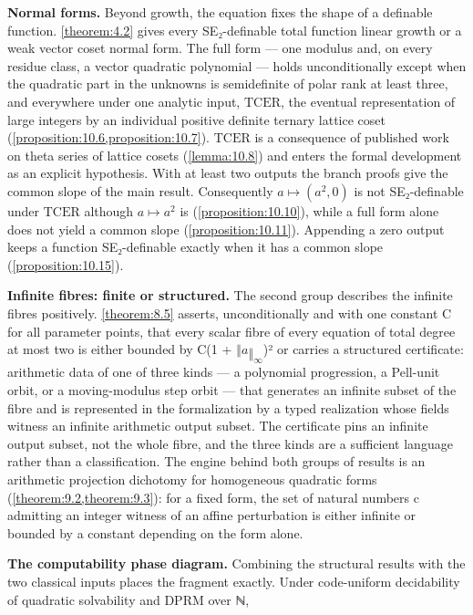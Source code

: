 \documentclass[11pt]{article}
\theoremstyle{plain}
\theoremstyle{definition}
\theoremstyle{remark}
\theoremstyle{plain}
\theoremstyle{definition}
\theoremstyle{remark}
\theoremstyle{plain}
\theoremstyle{definition}
\theoremstyle{remark}
\begin{document}
\textbf{Normal forms.} Beyond growth, the equation fixes the shape of a definable function. \cref{theorem:4.2} gives every SE₂-definable total function linear growth or a weak vector coset normal form. The full form --- one modulus and, on every residue class, a vector quadratic polynomial --- holds unconditionally except when the quadratic part in the unknowns is semidefinite of polar rank at least three, and everywhere under one analytic input, $\mathrm{TCER}$, the eventual representation of large integers by an individual positive definite ternary lattice coset (\cref{proposition:10.6,proposition:10.7}). $\mathrm{TCER}$ is a consequence of published work on theta series of lattice cosets (\cref{lemma:10.8}) and enters the formal development as an explicit hypothesis. With at least two outputs the branch proofs give the common slope of the main result. Consequently $a ↦ (a^{2}, 0)$ is not SE₂-definable under $\mathrm{TCER}$ although $a ↦ a^{2}$ is (\cref{proposition:10.10}), while a full form alone does not yield a common slope (\cref{proposition:10.11}). Appending a zero output keeps a function SE₂-definable exactly when it has a common slope (\cref{proposition:10.15}).

\textbf{Infinite fibres: finite or structured.} The second group describes the infinite fibres positively. \cref{theorem:8.5} asserts, unconditionally and with one constant C for all parameter points, that every scalar fibre of every equation of total degree at most two is either bounded by C(1 + $‖a‖_{∞}$)² or carries a structured certificate: arithmetic data of one of three kinds — a polynomial progression, a Pell-unit orbit, or a moving-modulus step orbit — that generates an infinite subset of the fibre and is represented in the formalization by a typed realization whose fields witness an infinite arithmetic output subset. The certificate pins an infinite output subset, not the whole fibre, and the three kinds are a sufficient language rather than a classification. The engine behind both groups of results is an arithmetic projection dichotomy for homogeneous quadratic forms (\cref{theorem:9.2,theorem:9.3}): for a fixed form, the set of natural numbers c admitting an integer witness of an affine perturbation is either infinite or bounded by a constant depending on the form alone.

\textbf{The computability phase diagram.} Combining the structural results with the two classical inputs places the fragment exactly. Under code-uniform decidability of quadratic solvability and DPRM over ℕ,
\end{document}
